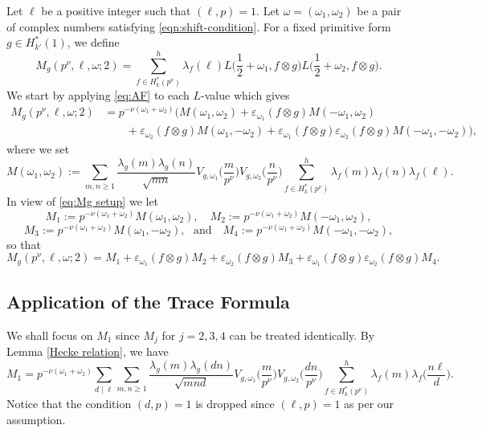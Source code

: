 \documentclass[12pt]{amsart}
\theoremstyle{plain}
\theoremstyle{definition}
\newcommand{\ve}{\varepsilon}
\begin{document}
Let $\ell$ be a positive integer such that $(\ell,p)=1$. Let $\omega=(\omega_1, \omega_2)$ be a pair of complex numbers satisfying \eqref{eqn:shift-condition}. For a fixed primitive form $g\in H_{k'}^*(1)$, we define 
    \[
    M_g(p^{\nu},\ell, \omega; 2)
    = \sum^h_{f\in H^*_k(p^\nu)} 
    \lambda_f(\ell)
    L\Big(\frac12+\omega_1, f\otimes g\Big)
    L\Big(\frac12+\omega_2, f\otimes g\Big).
    \]
We start by applying \eqref{eq:AF} to each $L$-value which gives
    \begin{equation}\label{eq:Mg setup}
    \begin{split} 
    M_g(p^{\nu},\ell, \omega; 2)&= p^{-\nu(\omega_1+\omega_2)} \Big(M(\omega_1,\omega_2)+ \ve_{\omega_1}(f\otimes g)  M(-\omega_1,\omega_2)\\&\hspace{2em}+ \ve_{\omega_2}(f\otimes g)M(\omega_1,-\omega_2)+ \ve_{\omega_1}(f\otimes g)\ve_{\omega_2}(f\otimes g)M(-\omega_1,-\omega_2)\Big),    \end{split}
    \end{equation}
where we set
\[
M(\omega_1,\omega_2):=\sum_{m, n \geq 1}
    \frac{\lambda_g(m) \lambda_g(n)}{\sqrt{mn}} 
    V_{g, \omega_1}\Big(\frac{m}{p^\nu }\Big)
    V_{g, \omega_2}\Big(\frac{n}{p^\nu }\Big)
     \sum^h_{f\in H^*_k(p^\nu)} \lambda_f(m) \lambda_f(n) \lambda_f(\ell).
  \]
  In view of \eqref{eq:Mg setup}  we let
   \[
   M_1:=p^{-\nu(\omega_1+\omega_2)} M(\omega_1,\omega_2),\quad M_2:=p^{-\nu(\omega_1+\omega_2)} M(-\omega_1,\omega_2),
   \] 
   \[
   M_3:=p^{-\nu(\omega_1+\omega_2)} M(\omega_1,-\omega_2), \,\, \text{ and} \quad M_4:=p^{-\nu(\omega_1+\omega_2)} M(-\omega_1,-\omega_2),
   \]
   so that 
   \begin{equation}\label{eqn:Mg setup with Mi}
    M_g(p^{\nu},\ell, \omega; 2)= M_1+ \ve_{\omega_1}(f\otimes g)  M_2+ \ve_{\omega_2}(f\otimes g)M_3+ \ve_{\omega_1}(f\otimes g)\ve_{\omega_2}(f\otimes g)M_4.
   \end{equation}
 
 

\subsection{Application of the Trace Formula} 

We shall focus on $M_1$ since $M_j$ for $j=2,3,4$ can be treated identically. By Lemma \ref{Hecke relation}, we have 
        \[
    M_1= 
     p^{-\nu(\omega_1+\omega_2)} 
     \sum_{d\mid \ell} 
     \sum_{m, n \geq 1}
    \frac{\lambda_g(m) \lambda_g(d n)}{\sqrt{mn d}} 
    V_{g, \omega_1}\Big(\frac{m}{p^\nu }\Big)
    V_{g, \omega_2}\Big(\frac{d n}{p^\nu }\Big)
     \sum^h_{f\in H^*_k(p^\nu)} 
     \lambda_f(m)\lambda_f\Big( \frac{n\ell}{d}\Big). 
    \]
Notice that the condition $(d, p)=1$ is dropped since $(\ell, p)=1$ as per our assumption. 
\end{document}
